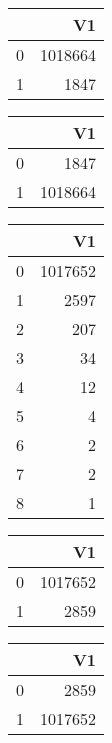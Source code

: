 \bigskip\bigskip
\centering
\begin{tabular}{rr}
  \hline
 & V1 \\ 
  \hline
0 & 1018664 \\ 
  1 & 1847 \\ 
   \hline
\end{tabular}

\bigskip\bigskip
\centering
\begin{tabular}{rr}
  \hline
 & V1 \\ 
  \hline
0 & 1847 \\ 
  1 & 1018664 \\ 
   \hline
\end{tabular}

\bigskip\bigskip
\centering
\begin{tabular}{rr}
  \hline
 & V1 \\ 
  \hline
0 & 1017652 \\ 
  1 & 2597 \\ 
  2 & 207 \\ 
  3 &  34 \\ 
  4 &  12 \\ 
  5 &   4 \\ 
  6 &   2 \\ 
  7 &   2 \\ 
  8 &   1 \\ 
   \hline
\end{tabular}

\bigskip\bigskip
\centering
\begin{tabular}{rr}
  \hline
 & V1 \\ 
  \hline
0 & 1017652 \\ 
  1 & 2859 \\ 
   \hline
\end{tabular}

\bigskip\bigskip
\centering
\begin{tabular}{rr}
  \hline
 & V1 \\ 
  \hline
0 & 2859 \\ 
  1 & 1017652 \\ 
   \hline
\end{tabular}

